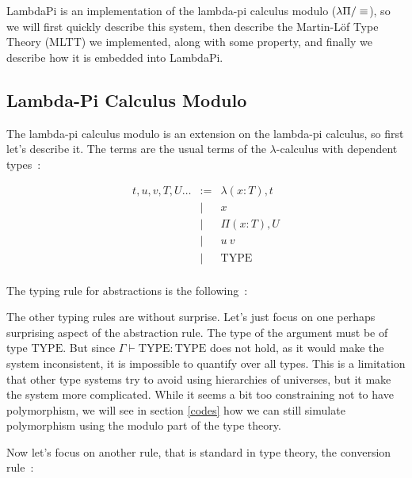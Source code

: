 
LambdaPi is an implementation of the lambda-pi calculus modulo ($\lp$), so we
will first quickly describe this system, then describe the Martin-Löf Type
Theory (MLTT) we implemented, along with some property, and finally we describe
how it is embedded into LambdaPi.

\subsection{Lambda-Pi Calculus Modulo}

The lambda-pi calculus modulo is an extension on the lambda-pi calculus, so
first let's describe it. The terms are the usual terms of the $\lambda$-calculus with
dependent types~:

\[\begin{array}{rcl}
    t, u, v, T, U\dots & := & \lambda(x : T), t \\
    & | & x \\
    & | & \Pi(x : T), U \\
    & | & u\ v \\
    & | & \text{TYPE} \\
 \end{array}\]

The typing rule for abstractions is the following~:

\begin{center}\begin{prooftree}
\end{prooftree}\end{center}

The other typing rules are without surprise. Let's just focus on one perhaps
surprising aspect of the abstraction rule. The type of the argument must be of
type $\text{TYPE}$. But since $\Gamma\vdash\text{TYPE} : \text{TYPE}$ does not hold, as it
would make the system inconsistent, it is impossible to quantify over all types.
This is a limitation that other type systems try to avoid using hierarchies of
universes, but it make the system more complicated. While it seems a bit too
constraining not to have polymorphism, we will see in section \ref{codes} how we
can still simulate polymorphism using the modulo part of the type theory.

Now let's focus on another rule, that is standard in type theory, the conversion
rule~:

\begin{center}\begin{prooftree}
\end{prooftree}\end{center}

